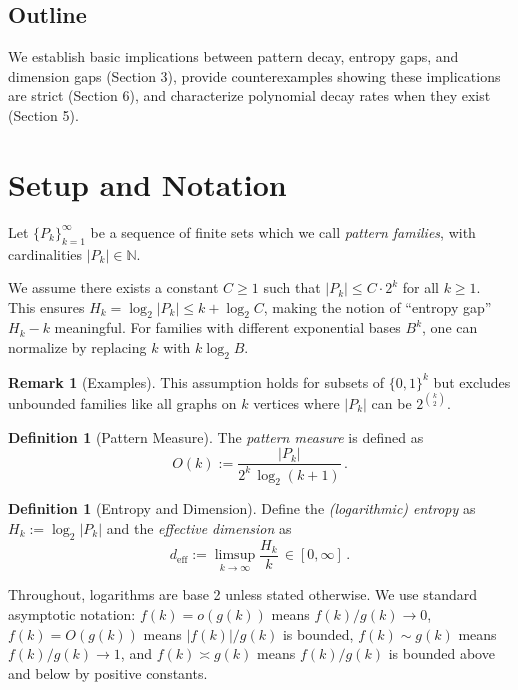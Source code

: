 \documentclass[11pt]{article}
\theoremstyle{definition}
\newtheorem{definition}[theorem]{Definition}
\newtheorem{remark}[theorem]{Remark}
\newcommand{\bbN}{\mathbb{N}}
\begin{document}
\subsection{Outline}

We establish basic implications between pattern decay, entropy gaps, and dimension gaps (Section 3), provide counterexamples showing these implications are strict (Section 6), and characterize polynomial decay rates when they exist (Section 5).

\section{Setup and Notation}

Let $\{P_k\}_{k=1}^\infty$ be a sequence of finite sets which we call \emph{pattern families}, with cardinalities $|P_k|\in\bbN$.

\begin{assumption}\label{ass:envelope}
We assume there exists a constant $C \geq 1$ such that $|P_k| \le C \cdot 2^k$ for all $k \geq 1$. This ensures $H_k = \log_2|P_k| \le k + \log_2 C$, making the notion of ``entropy gap'' $H_k - k$ meaningful. For families with different exponential bases $B^k$, one can normalize by replacing $k$ with $k\log_2 B$.
\end{assumption}

\begin{remark}[Examples]
This assumption holds for subsets of $\{0,1\}^k$ but excludes unbounded families like all graphs on $k$ vertices where $|P_k|$ can be $2^{\binom{k}{2}}$.
\end{remark} 

\begin{definition}[Pattern Measure]
The \emph{pattern measure} is defined as
\begin{equation}
O(k):= \frac{|P_k|}{2^k\,\log_2(k+1)}\,.
\end{equation}
\end{definition}

\begin{definition}[Entropy and Dimension]
Define the \emph{(logarithmic) entropy} as $H_k:=\log_2|P_k|$ and the \emph{effective dimension} as
\begin{equation}
d_{\mathrm{eff}}:=\limsup_{k\to\infty} \frac{H_k}{k}\,\in[0,\infty]\,.
\end{equation}
\end{definition}

Throughout, logarithms are base 2 unless stated otherwise. We use standard asymptotic notation: $f(k)=o(g(k))$ means $f(k)/g(k)\to 0$, $f(k)=O(g(k))$ means $|f(k)|/g(k)$ is bounded, $f(k)\sim g(k)$ means $f(k)/g(k) \to 1$, and $f(k)\asymp g(k)$ means $f(k)/g(k)$ is bounded above and below by positive constants.
\end{document}
